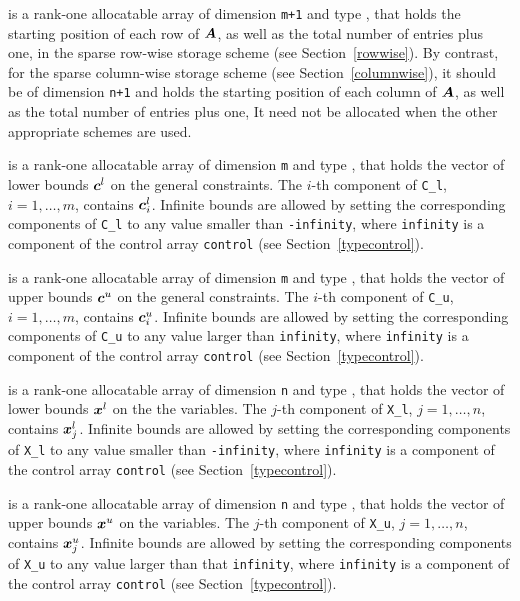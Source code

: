\documentclass{galahad}
\begin{document}
\begin{description}
\begin{description}
 is a rank-one allocatable array of dimension {\tt m+1} and type
\integer, that holds the starting position of each row of ${\bm{A}}$,
as well as the total number of entries plus one,
in the sparse row-wise storage scheme (see Section~\ref{rowwise}).
By contrast, for the sparse column-wise storage scheme
(see Section~\ref{columnwise}), it should be of dimension {\tt n+1}
and holds the starting position of each column of ${\bm{A}}$,
as well as the total number of entries plus one,
It need not be allocated when the other appropriate schemes are used.

\end{description}

 is a rank-one allocatable array of dimension {\tt m} and type
\realdp, that holds the vector of lower bounds ${\bm{c}}^{l}$
on the general constraints. The $i$-th component of
{\tt C\_l}, $i = 1, \ldots , m$, contains ${\bm{c}}_{i}^{l}$.
Infinite bounds are allowed by setting the corresponding
components of {\tt C\_l} to any value smaller than {\tt -infinity},
where {\tt infinity} is a component of the control array {\tt control}
(see Section~\ref{typecontrol}).

 is a rank-one allocatable array of dimension {\tt m} and type
\realdp, that holds the vector of upper bounds ${\bm{c}}^{u}$
on the general constraints. The $i$-th component of
{\tt C\_u}, $i = 1,  \ldots ,  m$, contains ${\bm{c}}_{i}^{u}$.
Infinite bounds are allowed by setting the corresponding
components of {\tt C\_u} to any value larger than {\tt infinity},
where {\tt infinity} is a component of the control array {\tt control}
(see Section~\ref{typecontrol}).

 is a rank-one allocatable array of dimension {\tt n} and type
\realdp, that holds
the vector of lower bounds ${\bm{x}}^{l}$ on the the variables.
The $j$-th component of {\tt X\_l}, $j = 1, \ldots , n$,
contains ${\bm{x}}_{j}^{l}$.
Infinite bounds are allowed by setting the corresponding
components of {\tt X\_l} to any value smaller than {\tt -infinity},
where {\tt infinity} is a component of the control array {\tt control}
(see Section~\ref{typecontrol}).

 is a rank-one allocatable array of dimension {\tt n} and type
\realdp, that holds
the vector of upper bounds ${\bm{x}}^{u}$ on the variables.
The $j$-th component of {\tt X\_u}, $j = 1, \ldots , n$,
contains ${\bm{x}}_{j}^{u}$.
Infinite bounds are allowed by setting the corresponding
components of {\tt X\_u} to any value larger than that {\tt infinity},
where {\tt infinity} is a component of the control array {\tt control}
(see Section~\ref{typecontrol}).


\end{description}
\end{document}
